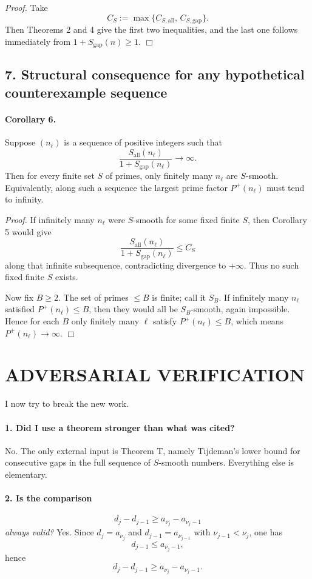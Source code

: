 \emph{Proof.}
Take
\[
C_S:=\max\{C_{S,\mathrm{all}},\,C_{S,\mathrm{gap}}\}.
\]
Then Theorems 2 and 4 give the first two inequalities, and the last one follows immediately from \(1+S_{\mathrm{gap}}(n)\ge 1\).
\hfill\(\Box\)

\subsection*{7. Structural consequence for any hypothetical counterexample sequence}

\paragraph{Corollary 6.}
Suppose \((n_\ell)\) is a sequence of positive integers such that
\[
\frac{S_{\mathrm{all}}(n_\ell)}{1+S_{\mathrm{gap}}(n_\ell)}\to \infty.
\]
Then for every finite set \(S\) of primes, only finitely many \(n_\ell\) are \(S\)-smooth. Equivalently, along such a sequence the largest prime factor \(P^+(n_\ell)\) must tend to infinity.

\emph{Proof.}
If infinitely many \(n_\ell\) were \(S\)-smooth for some fixed finite \(S\), then Corollary 5 would give
\[
\frac{S_{\mathrm{all}}(n_\ell)}{1+S_{\mathrm{gap}}(n_\ell)}\le C_S
\]
along that infinite subsequence, contradicting divergence to \(+\infty\). Thus no such fixed finite \(S\) exists.

Now fix \(B\ge 2\). The set of primes \(\le B\) is finite; call it \(S_B\). If infinitely many \(n_\ell\) satisfied \(P^+(n_\ell)\le B\), then they would all be \(S_B\)-smooth, again impossible. Hence for each \(B\) only finitely many \(\ell\) satisfy \(P^+(n_\ell)\le B\), which means \(P^+(n_\ell)\to\infty\).
\hfill\(\Box\)

\section{ADVERSARIAL VERIFICATION}

I now try to break the new work.

\paragraph{1. Did I use a theorem stronger than what was cited?}
No. The only external input is Theorem T, namely Tijdeman's lower bound for consecutive gaps in the full sequence of \(S\)-smooth numbers. Everything else is elementary.

\paragraph{2. Is the comparison}
\[
d_j-d_{j-1}\ge a_{\nu_j}-a_{\nu_j-1}
\]
\emph{always valid?}
Yes. Since \(d_j=a_{\nu_j}\) and \(d_{j-1}=a_{\nu_{j-1}}\) with \(\nu_{j-1}<\nu_j\), one has
\[
d_{j-1}\le a_{\nu_j-1},
\]
hence
\[
d_j-d_{j-1}\ge a_{\nu_j}-a_{\nu_j-1}.
\]

